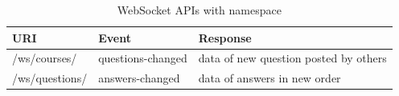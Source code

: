 \begin{table}[!htbp]
\centering
\begin{tabularx}{\textwidth}{@{}llX@{}}
\toprule
URI                       & Event           & Response                           \\ \midrule
/ws/courses/            & questions-changed       &  data of new question posted by others \\
/ws/questions/          & answers-changed      &  data of answers in new order          \\ \bottomrule
\end{tabularx}
\caption{WebSocket APIs with namespace}
\label{table:websocket-def}
\end{table}

